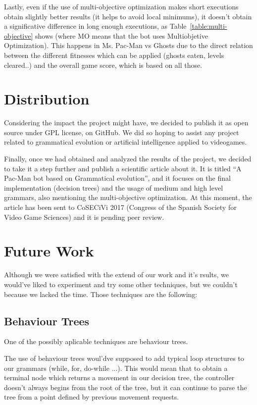 Lastly, even if the use of multi-objective optimization makes short executions obtain slightly better results (it helps to avoid local minimums), it doesn’t obtain a significative difference in long enough executions, as Table~\ref{table:multi-objective} shows (where MO means that the bot uses Multiobjetive Optimization). This happens in Ms. Pac-Man vs Ghosts due to the direct relation between the different fitnesses which can be applied (ghosts eaten, levels cleared..) and the overall game score, which is based on all those.

\section{Distribution}
Considering the impact the project might have, we decided to publish it as open source under GPL \cite{licenseThesisGit} license, on GitHub. We did so hoping to assist any project related to grammatical evolution or artificial intelligence applied to videogames. 

Finally, once we had obtained and analyzed the results of the project, we decided to take it a step further and publish a scientific article about it. It is titled ``A Pac-Man bot based on Grammatical evolution'', and it focuses on the final implementation (decision trees) and the usage of medium and high level grammars, also mentioning the multi-objective optimization. At this moment, the article has been sent to CoSECiVi 2017 (Congress of the Spanish Society for Video Game Sciences) and it is pending peer review.

\section{Future Work}
Although we were satisfied with the extend of our work and it's rsults, we would've liked to experiment and try some other techniques, but we couldn't because we lacked the time. Those techniques are the following:

\subsection{Behaviour Trees}
One of the possibly aplicable techniques are behaviour trees.

The use of behaviour trees woul'dve supposed to add typical loop structures to our grammars (while, for, do-while ...). This would mean that to obtain a terminal node which returns a movement in our decision tree, the controller doesn't always begins from the root of the tree, but it can continue to parse the tree from a point defined by previous movement requests.

